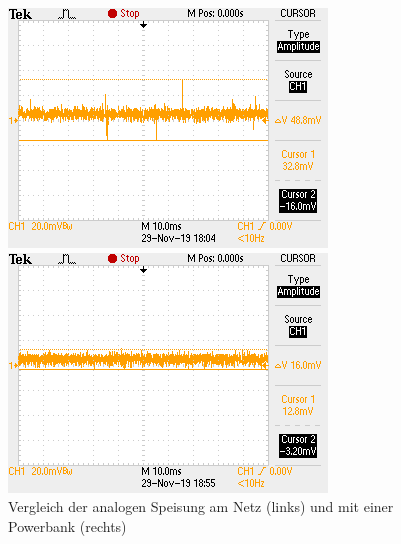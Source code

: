 \begin{figure} [H]
\begin{minipage}[c]{0.45\textwidth}
\includegraphics[width=\textwidth]{graphics/Speisung_Netz_Analog.png}
\end{minipage}
\begin{minipage}[c]{0.45\textwidth}
\includegraphics[width=\textwidth]{graphics/Speisung_PB_Analog.png}
\end{minipage}
\caption{Vergleich der analogen Speisung am Netz (links) und mit einer Powerbank (rechts)}
\label{fig:analogspeisung}
\end{figure} 

